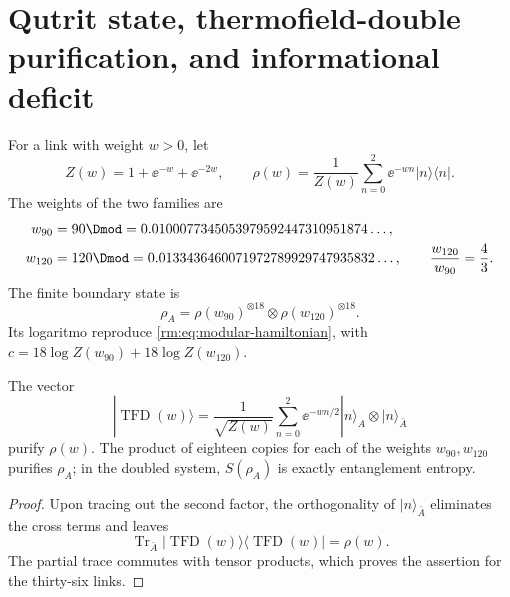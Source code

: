 \section{Qutrit state, thermofield-double purification, and
informational deficit}

For a link with weight \(w>0\), let
\begin{equation}
\label{rm:eq:modular-link-state}
Z(w)=1+\ee^{-w}+\ee^{-2w},
\qquad
\rho(w)=\frac1{Z(w)}\sum_{n=0}^2\ee^{-wn}|n\rangle\langle n|.
\end{equation}
The weights of the two families are
\begin{align}
w_{90}&=90\Dmod
=0.0100077345053979592447310951874\ldots,
\label{rm:eq:modular-w90}\\
w_{120}&=120\Dmod
=0.0133436460071972789929747935832\ldots,
\qquad \frac{w_{120}}{w_{90}}=\frac43.
\label{rm:eq:modular-w120}
\end{align}
The finite boundary state is
\begin{equation}
\label{rm:eq:modular-product-state}
\rho_A=\rho(w_{90})^{\otimes18}
\otimes\rho(w_{120})^{\otimes18}.
\end{equation}
Its logaritmo reproduce \cref{rm:eq:modular-hamiltonian}, with
\(c=18\log Z(w_{90})+18\log Z(w_{120})\).

\begin{theorem}
\label{rm:thm:modular-tfd}
The vector
\begin{equation}
\label{rm:eq:modular-tfd-link}
|\operatorname{TFD}(w)\rangle
=\frac1{\sqrt{Z(w)}}\sum_{n=0}^2
\ee^{-wn/2}|n\rangle_A\otimes|n\rangle_{\bar A}
\end{equation}
purify \(\rho(w)\). The product of eighteen copies for each of the
weights \(w_{90},w_{120}\) purifies \(\rho_A\); in the doubled system,
\(S(\rho_A)\) is exactly entanglement entropy.
\end{theorem}

\begin{proof}
Upon tracing out the second factor, the orthogonality of \(|n\rangle_{\bar A}\)
eliminates the cross terms and leaves
\[
\operatorname{Tr}_{\bar A}
|\operatorname{TFD}(w)\rangle\langle\operatorname{TFD}(w)|
=\rho(w).
\]
The partial trace commutes with tensor products, which proves the
assertion for the thirty-six links.
\end{proof}

